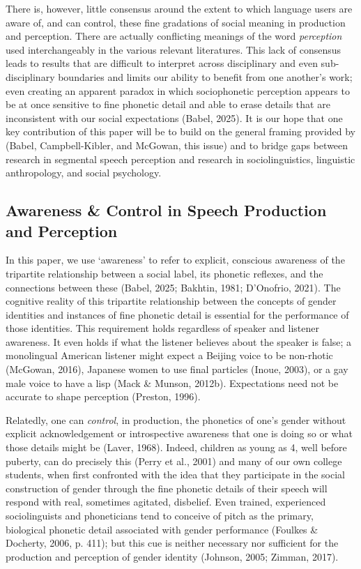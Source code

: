 \documentclass[
  letterpaper,
  DIV=11,
  numbers=noendperiod]{scrartcl}
\begin{document}
There is, however, little consensus around the extent to which language
users are aware of, and can control, these fine gradations of social
meaning in production and perception. There are actually conflicting
meanings of the word \emph{perception} used interchangeably in the
various relevant literatures. This lack of consensus leads to results
that are difficult to interpret across disciplinary and even
sub-disciplinary boundaries and limits our ability to benefit from one
another's work; even creating an apparent paradox in which sociophonetic
perception appears to be at once sensitive to fine phonetic detail and
able to erase details that are inconsistent with our social expectations
(Babel, 2025). It is our hope that one key contribution of this paper
will be to build on the general framing provided by (Babel,
Campbell-Kibler, and McGowan, this issue) and to bridge gaps between
research in segmental speech perception and research in
sociolinguistics, linguistic anthropology, and social psychology.

\subsection{Awareness \& Control in Speech Production and
Perception}\label{sec-background}

In this paper, we use `awareness' to refer to explicit, conscious
awareness of the tripartite relationship between a social label, its
phonetic reflexes, and the connections between these (Babel, 2025;
Bakhtin, 1981; D'Onofrio, 2021). The cognitive reality of this
tripartite relationship between the concepts of gender identities and
instances of fine phonetic detail is essential for the performance of
those identities. This requirement holds regardless of speaker and
listener awareness. It even holds if what the listener believes about
the speaker is false; a monolingual American listener might expect a
Beijing voice to be non-rhotic (McGowan, 2016), Japanese women to use
final particles (Inoue, 2003), or a gay male voice to have a lisp (Mack
\& Munson, 2012b). Expectations need not be accurate to shape perception
(Preston, 1996).

Relatedly, one can \emph{control}, in production, the phonetics of one's
gender without explicit acknowledgement or introspective awareness that
one is doing so or what those details might be (Laver, 1968). Indeed,
children as young as 4, well before puberty, can do precisely this
(Perry et al., 2001) and many of our own college students, when first
confronted with the idea that they participate in the social
construction of gender through the fine phonetic details of their speech
will respond with real, sometimes agitated, disbelief. Even trained,
experienced sociolinguists and phoneticians tend to conceive of pitch as
the primary, biological phonetic detail associated with gender
performance (Foulkes \& Docherty, 2006, p. 411); but this cue is neither
necessary nor sufficient for the production and perception of gender
identity (Johnson, 2005; Zimman, 2017).
\end{document}
